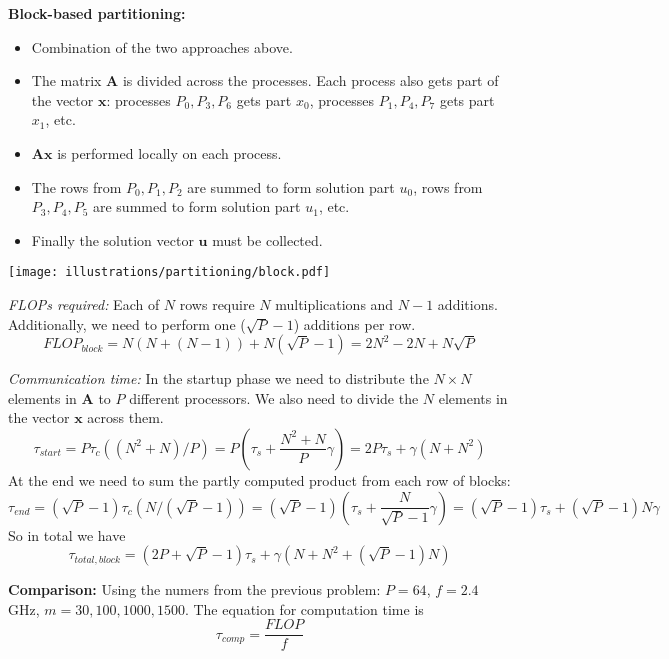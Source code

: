 \noindent\textbf{Block-based partitioning:}

\begin{itemize}
  \item Combination of the two approaches above.
  \item The matrix $\mathbf{A}$ is divided across the processes. Each process also gets part of the vector $\mathbf{x}$: processes $P_0, P_3, P_6$ gets part $x_0$, processes $P_1, P_4, P_7$ gets part $x_1$, etc.
  \item $\mathbf{Ax}$ is performed locally on each process.
  \item The rows from $P_0, P_1, P_2$ are summed to form solution part $u_0$, rows from $P_3, P_4, P_5$ are summed to form solution part $u_1$, etc.
  \item Finally the solution vector $\mathbf{u}$ must be collected.
\end{itemize}

\begin{center}
  \texttt{[image: illustrations/partitioning/block.pdf]}
\end{center}

\noindent \emph{FLOPs required:} Each of $N$ rows require $N$ multiplications and $N-1$ additions. Additionally, we need to perform one ($\sqrt{P}-1$) additions per row.
\[
  FLOP_{block} =  N ( N + (N-1) ) + N( \sqrt{P}-1 ) = 2N^2  - 2N + N \sqrt{P}
\]

\noindent \emph{Communication time:} In the startup phase we need to distribute the $N\times N$ elements in $\mathbf{A}$ to $P$ different processors. We also need to divide the $N$ elements in the vector $\mathbf{x}$ across them.
\[
  \tau_{start} = P\tau_c((N^2+N)/P) = P \left( \tau_s + \frac{N^2+N}{P} \gamma \right) = 2P\tau_s + \gamma(N+N^2)
\]
At the end we need to sum the partly computed product from each row of blocks:
\[
  \tau_{end} = (\sqrt{P}-1) \tau_c(N/(\sqrt{P}-1)) = (\sqrt{P}-1) \left( \tau_s + \frac{N}{\sqrt{P}-1} \gamma \right) = (\sqrt{P}-1)\tau_s + (\sqrt{P}-1)N\gamma
\]
So in total we have
\[
  \tau_{total,block} = (2P+\sqrt{P}-1)\tau_s + \gamma(N+N^2+(\sqrt{P}-1)N)
\]

\noindent \textbf{Comparison:} Using the numers from the previous problem: $P=64$, $f=2.4$ GHz, $m=30,100,1000,1500$. The equation for computation time is
\[
  \tau_{comp} = \frac{FLOP}{f}
\]

